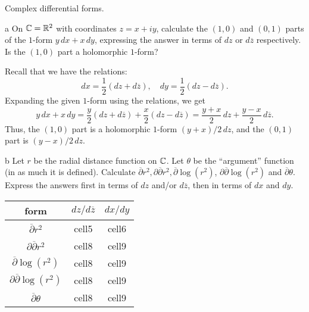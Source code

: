 \documentclass{lkx_pset}
\begin{document}
\begin{problem}{5}
  Complex differential forms.
\end{problem}

\begin{parts}
  \begin{part}{a}
    On $\mathbb{C} = \mathbb{R}^2$ with coordinates $z=x+iy$, calculate the $(1,0)$ and $(0,1)$ parts of the $1$-form $y\,dx + x\,dy$, expressing the answer in terms of $dz$ or $d\overline{z}$ respectively. Is the $(1,0)$ part a holomorphic $1$-form?
  \end{part}

  Recall that we have the relations:
  \[
    dx = \frac{1}{2}(dz+d\overline{z}),\quad dy = \frac{1}{2}(dz - d\overline{z}).
  \]
  Expanding the given $1$-form using the relations, we get
  \[
    y\,dx + x\,dy = \frac{y}{2}(dz+d\overline{z}) + \frac{x}{2}(dz - d\overline{z}) = \frac{y+x}{2}\,dz + \frac{y-x}{2}\,d\overline{z}.
  \]
  Thus, the $(1,0)$ part is a holomorphic $1$-form $(y+x)/2\,dz$, and the $(0,1)$ part is $(y-x)/2\,dz$.

  \begin{part}{b}
    Let $r$ be the radial distance function on $\mathbb{C}$. Let $\theta$ be the ``argument'' function (in as much it is defined). Calculate $\overline{\partial} r^2, \partial\overline{\partial} r^2, \overline{\partial}\log(r^2)$, $\partial\overline{\partial} \log(r^2)$ and $\overline{\partial}\theta$. Express the answers first in terms of $dz$ and/or $d\overline{z}$, then in terms of $dx$ and $dy$.
  \end{part}

  \begin{center}
    \renewcommand*{\arraystretch}{1.2}
    \begin{tabular}{|c|c|c|} 
     \hline
     \textrm{form} & $dz/d\overline{z}$ & $dx/dy$ \\ 
     \hline
     $\overline{\partial} r^2$ & cell5 & cell6 \\ 
     $\partial\overline{\partial} r^2$ & cell8 & cell9 \\ 
     $\overline{\partial} \log(r^2)$ & cell8 & cell9 \\ 
     $\partial \overline{\partial} \log(r^2)$ & cell8 & cell9 \\ 
     $\overline{\partial} \theta$ & cell8 & cell9 \\ 
     \hline
    \end{tabular}
  \end{center}

\end{parts}
\end{document}
